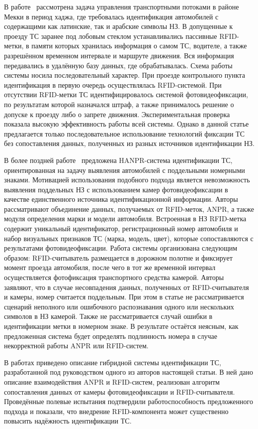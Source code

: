 \documentclass[12pt]{article}
\theoremstyle{definition}
\begin{document}
В работе~\cite{mohandes2016intelligent} рассмотрена задача управления транспортными потоками в районе Мекки в период хаджа, где требовалась идентификация автомобилей с содержащими как латинские, так и арабские символы НЗ. В допущенные к проезду ТС заранее под лобовым стеклом устанавливались пассивные RFID-метки, в памяти которых хранилась информация о самом ТС, водителе, а также разрешённом временном интервале и маршруте движения. Вся информация передавались в удалённую базу данных, где обрабатывалась. Схема работы системы носила последовательный характер. При проезде контрольного пункта идентификация в первую очередь осуществлялась RFID-системой. При отсутствии RFID-метки ТС идентифицировалось системой фотовидеофиксации, по результатам которой назначался штраф, а также принималось решение о допуске к проезду либо о запрете движения. Экспериментальная проверка показала высокую эффективность работы всей системы. Однако в данной статье предлагается только последовательное использование технологий фиксации ТС без сопоставления данных, полученных из разных источников идентификации НЗ.

В более поздней работе~\cite{fiorita2024combining} предложена HANPR-система идентификации ТС, ориентированная на задачу выявления автомобилей с поддельными номерными знаками. Мотивацией использования подобного подхода является невозможность выявления поддельных НЗ с использованием камер фотовидеофиксации в качестве единственного источника идентификационной информации. Авторы рассматривают объединение данных, получаемых от RFID-меток, ANPR, а также модуля определения марки и модели автомобиля. Встроенная в НЗ RFID-метка содержит уникальный идентификатор, регистрационный номер автомобиля и набор визуальных признаков ТС (марка, модель, цвет), которые сопоставляются с результатами фотовидеофиксации. Работа системы организована следующим образом: RFID-считыватель размещается в дорожном полотне и фиксирует момент проезда автомобиля, после чего в тот же временной интервал осуществляется фотофиксация транспортного средства камерой. Авторы заявляют, что в случае несовпадения данных, полученных от RFID-считывателя и камеры, номер считается поддельным. При этом в статье не рассматривается сценарий неполного или ошибочного распознавания одного или нескольких символов в НЗ камерой. Также не рассматривается случай ошибки в идентификации метки в номерном знаке. В результате остаётся неясным, как предложенная система будет определять подлинность номера в случае некорректной работы ANPR или RFID-систем.

В работах \cite{Larionov2022hybrid, Vishnevsky2022} приведено описание гибридной системы идентификации ТС, разработанной под руководством одного из авторов настоящей статьи. В ней дано описание взаимодействия ANPR и RFID-систем, реализован алгоритм сопоставления данных от камеры фотовидеофиксации и RFID-считывателя. Проведённые полевые испытания подтвердили работоспособность предложенного подхода и показали, что внедрение RFID-компонента может существенно повысить надёжность идентификации ТС.
\end{document}
